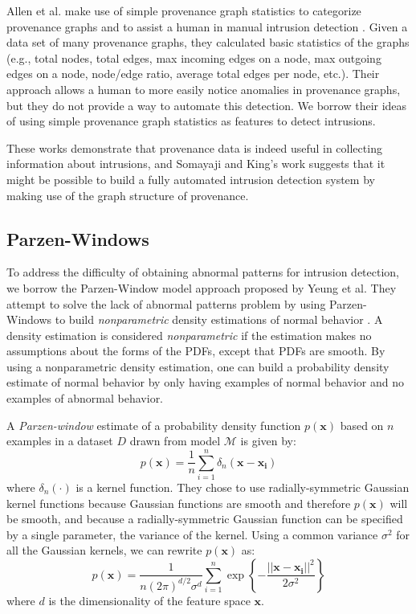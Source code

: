 \documentclass[10pt,twocolumn]{article}
\newcommand{\m}[1]{\mathbf{#1}}
\begin{document}
Allen et al. make use of simple provenance graph statistics to categorize provenance graphs and to assist a human
in manual intrusion detection \cite{provstat}. Given a data set of many provenance graphs, they calculated basic statistics
of the graphs (e.g., total nodes, total edges, max incoming edges on a node, max outgoing edges on a node,
node/edge ratio, average total edges per node, etc.). Their approach allows a human to more easily
notice anomalies in provenance graphs, but they do not provide a way to automate this detection.
We borrow their ideas of using simple provenance graph statistics as features to detect intrusions.

These works demonstrate that provenance data is indeed useful in collecting information about intrusions, and
Somayaji and King's work suggests that it might be possible to build a fully automated intrusion detection
system by making use of the graph structure of provenance.

\subsection{Parzen-Windows}

To address the difficulty of obtaining abnormal patterns for intrusion detection, we borrow
the Parzen-Window model approach proposed by Yeung et al.
They attempt to solve the lack of abnormal patterns problem by using Parzen-Windows to build {\em nonparametric}
density estimations of normal behavior \cite{parzen}. A density estimation is considered {\em nonparametric} if the estimation
makes no assumptions about the forms of the PDFs, except that PDFs are smooth. By using a nonparametric
density estimation, one can build a probability density estimate of normal behavior by only having examples of normal
behavior and no examples of abnormal behavior.

A {\em Parzen-window} estimate of a probability density function $p(\m{x})$
based on $n$ examples in a dataset $D$ drawn from model $\mathcal{M}$ is given by:
$$p(\m{x}) = \frac{1}{n} \sum_{i=1}^n \delta_n (\m{x} - \m{x_i})$$
where $\delta_n(\cdot)$ is a kernel function. They chose to use radially-symmetric Gaussian kernel functions because
Gaussian functions are smooth and therefore $p(\m{x})$ will be smooth, and because a radially-symmetric Gaussian function
can be specified by a single parameter, the variance of the kernel. Using a common variance $\sigma^2$ for all
the Gaussian kernels, we can rewrite $p(\m{x})$ as:
$$p(\m{x}) = \frac{1}{n(2\pi)^{d/2} \sigma^d} \sum_{i=1}^n  \exp \left\{  - \frac{|| \m{x} - \m{x_i}||^2}{2 \sigma^2}  \right\}$$
where $d$ is the dimensionality of the feature space $\m{x}$.
\end{document}
